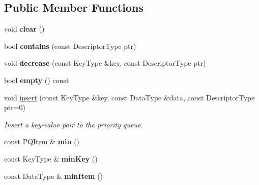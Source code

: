 \subsection*{Public Member Functions}
\begin{DoxyCompactItemize}
\item 
\hypertarget{class_priority_queue_ae17e52b2596e934e4a38d46f02b78e07}{
void {\bfseries clear} ()}
\label{class_priority_queue_ae17e52b2596e934e4a38d46f02b78e07}

\item 
\hypertarget{class_priority_queue_a3d48dee27f8f06e8d50da3adf294cd02}{
bool {\bfseries contains} (const DescriptorType ptr)}
\label{class_priority_queue_a3d48dee27f8f06e8d50da3adf294cd02}

\item 
\hypertarget{class_priority_queue_af5c41cacf132acb8e764e57573e68c2f}{
void {\bfseries decrease} (const KeyType \&key, const DescriptorType ptr)}
\label{class_priority_queue_af5c41cacf132acb8e764e57573e68c2f}

\item 
\hypertarget{class_priority_queue_adb45112ab9cd42aff88f39973d2e3c99}{
bool {\bfseries empty} () const }
\label{class_priority_queue_adb45112ab9cd42aff88f39973d2e3c99}

\item 
void \hyperlink{class_priority_queue_aa8e6289ad1b0f220efe2451644922bf0}{insert} (const KeyType \&key, const DataType \&data, const DescriptorType ptr=0)
\begin{DoxyCompactList}\small\item\em Insert a key-\/value pair to the priority queue. \item\end{DoxyCompactList}\item 
\hypertarget{class_priority_queue_ac35a32c6a9ffdfc012d772d4acf4841f}{
const \hyperlink{class_heap_item}{PQItem} \& {\bfseries min} ()}
\label{class_priority_queue_ac35a32c6a9ffdfc012d772d4acf4841f}

\item 
\hypertarget{class_priority_queue_a301a70970503fe25ec493a2fddf03557}{
const KeyType \& {\bfseries minKey} ()}
\label{class_priority_queue_a301a70970503fe25ec493a2fddf03557}

\item 
\hypertarget{class_priority_queue_a00079ca0b496f7dd97ffa74c9e32eb35}{
const DataType \& {\bfseries minItem} ()}
\label{class_priority_queue_a00079ca0b496f7dd97ffa74c9e32eb35}


\end{DoxyCompactItemize}
